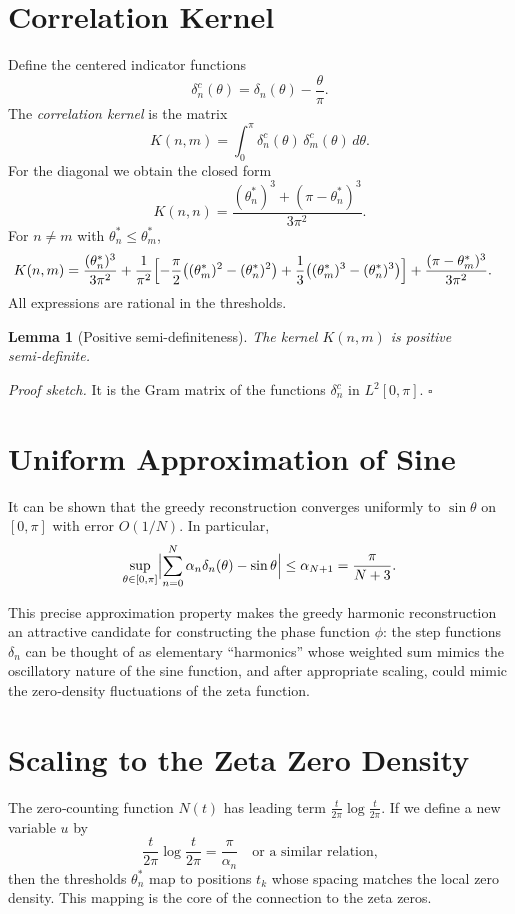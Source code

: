 \documentclass[12pt,a4paper,oneside]{book}
\newtheorem{lemma}[theorem]{Lemma}
\begin{document}
\section{Correlation Kernel}
Define the centered indicator functions
\[
\delta_n^c(\theta) = \delta_n(\theta) - \frac{\theta}{\pi}.
\]
The \emph{correlation kernel} is the matrix
\[
K(n,m) = \int_0^\pi \delta_n^c(\theta)\,\delta_m^c(\theta)\,d\theta.
\]
For the diagonal we obtain the closed form
\[
K(n,n) = \frac{(\theta_n^*)^3 + (\pi - \theta_n^*)^3}{3\pi^2}.
\tag{7}
\]
For \(n\neq m\) with \(\theta_n^*\le\theta_m^*\),
\begin{align*}
K(n,m) &= \frac{(\theta_n^*)^3}{3\pi^2}
        + \frac{1}{\pi^2}\Bigl[ -\frac{\pi}{2}\bigl((\theta_m^*)^2-(\theta_n^*)^2\bigr)
        + \frac{1}{3}\bigl((\theta_m^*)^3-(\theta_n^*)^3\bigr) \Bigr]
        + \frac{(\pi-\theta_m^*)^3}{3\pi^2}.
\end{align*}
All expressions are rational in the thresholds.
\begin{lemma}[Positive semi-definiteness]
The kernel \(K(n,m)\) is positive semi‑definite.
\end{lemma}
\noindent\textit{Proof sketch.}  It is the Gram matrix of the functions \(\delta_n^c\) in \(L^2[0,\pi]\). \(\square\)

\section{Uniform Approximation of Sine}
It can be shown that the greedy reconstruction converges uniformly to \(\sin\theta\) on \([0,\pi]\) with error \(O(1/N)\).  In particular,
\[
\sup_{\theta\in[0,\pi]} \Bigl| \sum_{n=0}^{N} \alpha_n \delta_n(\theta) - \sin\theta \Bigr| \le \alpha_{N+1} = \frac{\pi}{N+3}.
\]

This precise approximation property makes the greedy harmonic reconstruction an attractive candidate for constructing the phase function \(\phi\): the step functions \(\delta_n\) can be thought of as elementary ``harmonics'' whose weighted sum mimics the oscillatory nature of the sine function, and after appropriate scaling, could mimic the zero‑density fluctuations of the zeta function.

\section{Scaling to the Zeta Zero Density}
The zero‑counting function \(N(t)\) has leading term \(\frac{t}{2\pi}\log\frac{t}{2\pi}\).  If we define a new variable \(u\) by
\[
\frac{t}{2\pi}\log\frac{t}{2\pi} = \frac{\pi}{\alpha_n} \quad\text{or a similar relation,}
\]
then the thresholds \(\theta_n^*\) map to positions \(t_k\) whose spacing matches the local zero density.  This mapping is the core of the connection to the zeta zeros.
\end{document}
